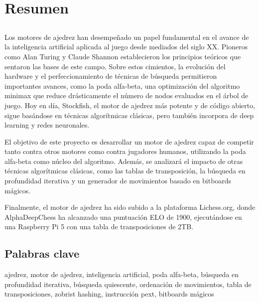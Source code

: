 \chapter*{Resumen}

\section*{\tituloPortadaVal}

Los motores de ajedrez han desempeñado un papel fundamental en el avance de la inteligencia artificial aplicada al juego desde mediados del siglo XX. Pioneros como Alan Turing y Claude Shannon establecieron los principios teóricos que sentaron las bases de este campo. Sobre estos cimientos, la evolución del hardware y el perfeccionamiento de técnicas de búsqueda permitieron importantes avances, como la poda alfa-beta, una optimización del algoritmo minimax que reduce drásticamente el número de nodos evaluados en el árbol de juego. Hoy en día, Stockfish, el motor de ajedrez más potente y de código abierto, sigue basándose en técnicas algorítmicas clásicas, pero también incorpora de deep learning y redes neuronales.

\vspace{1em}

El objetivo de este proyecto es desarrollar un motor de ajedrez capaz de competir tanto contra otros motores como contra jugadores humanos, utilizando la poda alfa-beta como núcleo del algoritmo. Además, se analizará el impacto de otras técnicas algorítmicas clásicas, como las tablas de transposición, la búsqueda en profundidad iterativa y un generador de movimientos basado en bitboards mágicos.

\vspace{1em}

Finalmente, el motor de ajedrez ha sido subido a la plataforma Lichess.org, donde AlphaDeepChess ha alcanzado una puntuación ELO de 1900, ejecutándose en una Raspberry Pi 5 con una tabla de transposiciones de 2TB.

\section*{Palabras clave}
   
\noindent ajedrez, motor de ajedrez, inteligencia artificial, poda alfa-beta, búsqueda en profundidad iterativa, búsqueda quiescente, ordenación de movimientos, tabla de transposiciones, zobrist hashing, instrucción pext, bitboards mágicos 
   


